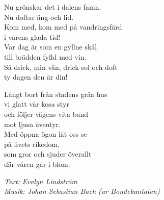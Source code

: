 \vspace{10pt}
Nu grönskar det i dalens famn.\\
Nu doftar äng och lid.\\
Kom med, kom med på vandringsfärd\\
i vårens glada tid!\\
Var dag är som en gyllne skål\\
till brädden fylld med vin.\\
Så drick, min vän, drick sol och doft\\
ty dagen den är din!\par
\vspace{10pt}
Långt bort från stadens gråa hus\\
vi glatt vår kosa styr\\
och följer vägens vita band\\
mot ljusa äventyr.\\
Med öppna ögon låt oss se\\
på livets rikedom,\\
som gror och sjuder överallt\\
där våren går i blom.
\par
\vspace{10pt}
{\footnotesize\textit{Text: Evelyn Lindström\\ Musik: Johan Sebastian Bach (ur Bondekantaten)}}
